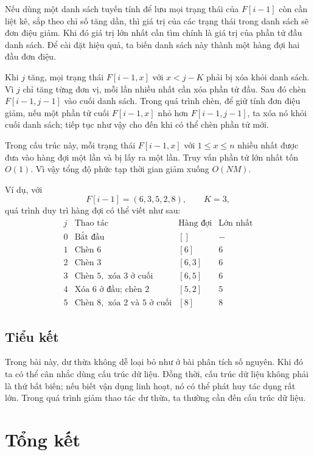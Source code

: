 \documentclass[11pt]{article}
\begin{document}
Nếu dùng một danh sách tuyến tính để lưu mọi trạng thái của $F[i-1]$ còn cần
liệt kê, sắp theo chỉ số tăng dần, thì giá trị của các trạng thái trong danh
sách sẽ đơn điệu giảm. Khi đó giá trị lớn nhất cần tìm chính là giá trị của
phần tử đầu danh sách. Để cài đặt hiệu quả, ta biến danh sách này thành một
hàng đợi hai đầu đơn điệu.

Khi $j$ tăng, mọi trạng thái $F[i-1,x]$ với $x<j-K$ phải bị xóa khỏi danh
sách. Vì $j$ chỉ tăng từng đơn vị, mỗi lần nhiều nhất cần xóa phần tử đầu.
Sau đó chèn $F[i-1,j-1]$ vào cuối danh sách. Trong quá trình chèn, để giữ
tính đơn điệu giảm, nếu một phần tử cuối $F[i-1,x]$ nhỏ hơn $F[i-1,j-1]$, ta
xóa nó khỏi cuối danh sách; tiếp tục như vậy cho đến khi có thể chèn phần tử
mới.

Trong cấu trúc này, mỗi trạng thái $F[i-1,x]$ với $1\le x\le n$ nhiều nhất
được đưa vào hàng đợi một lần và bị lấy ra một lần. Truy vấn phần tử lớn nhất
tốn $O(1)$. Vì vậy tổng độ phức tạp thời gian giảm xuống $O(NM)$.

Ví dụ, với
\[
  F[i-1]=(6,3,5,2,8),\qquad K=3,
\]
quá trình duy trì hàng đợi có thể viết như sau:
\[
\begin{array}{c|l|c|c}
j & \text{Thao tác} & \text{Hàng đợi} & \text{Lớn nhất}\\
\hline
0 & \text{Bắt đầu} & [] & -\\
1 & \text{Chèn }6 & [6] & 6\\
2 & \text{Chèn }3 & [6,3] & 6\\
3 & \text{Chèn }5,\text{ xóa }3\text{ ở cuối} & [6,5] & 6\\
4 & \text{Xóa }6\text{ ở đầu; chèn }2 & [5,2] & 5\\
5 & \text{Chèn }8,\text{ xóa }2\text{ và }5\text{ ở cuối} & [8] & 8
\end{array}
\]

\subsection{Tiểu kết}

Trong bài này, dư thừa không dễ loại bỏ như ở bài phân tích số nguyên. Khi đó
ta có thể cân nhắc dùng cấu trúc dữ liệu. Đồng thời, cấu trúc dữ liệu không
phải là thứ bất biến; nếu biết vận dụng linh hoạt, nó có thể phát huy tác dụng
rất lớn. Trong quá trình giảm thao tác dư thừa, ta thường cần đến cấu trúc dữ
liệu.

\section{Tổng kết}
\end{document}
